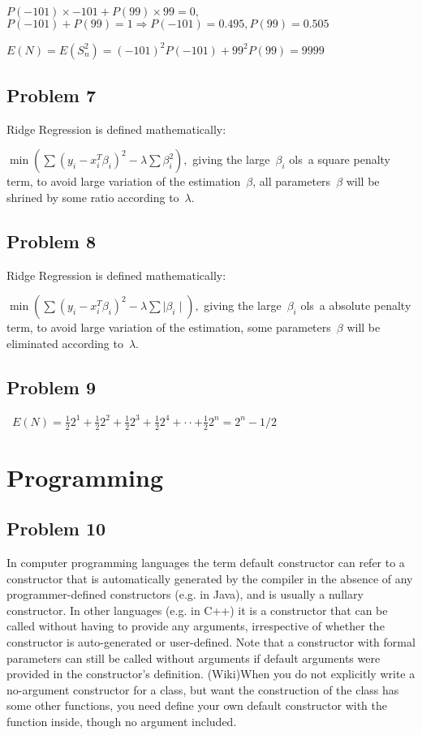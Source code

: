 \documentclass[10pt]{article}
\begin{document}
$P( -101) \times  -101 +P(99) \times 99 =0 ,$ $P( -101) +P(99) =1 \Longrightarrow P( -101) =0.495 ,P(99) =0.505$

$E(N) =E(S_{n}^{2}) =( -101)^{2}P( -101) +99^{2}P(99) =9999$

\subsection*{Problem 7~}
Ridge Regression is defined mathematically:

$\min (\sum (y_{i} -x_{i}^{T}\beta _{i})^{2} -\lambda \sum \beta _{i}^{2}) ,$ giving the large~$\beta _{i}$ ols~a square penalty term, to avoid large variation of the estimation~$\beta $, all parameters~$\beta $ will be shrined by some ratio according to~$\lambda $.

\subsection*{Problem 8~}
Ridge Regression is defined mathematically:

$\min (\sum (y_{i} -x_{i}^{T}\beta _{i})^{2} -\lambda \sum  \mid \beta _{i} \mid ) ,$ giving the large~$\beta _{i}$ ols~a absolute penalty term, to avoid large variation of the estimation, some parameters~$\beta $ will be eliminated according to~$\lambda $.

\subsection*{Problem 9}
~$E(N) =\frac{1}{2}2^{1} +\frac{1}{2}2^{2} +\frac{1}{2}2^{3} +\frac{1}{2}2^{4} + \cdot  \cdot $$ +\frac{1}{2}2^{n} =2^{n} -1/2$

\newpage

\section{Programming}

\subsection*{Problem 10~}
In computer programming languages the term default constructor can refer to a constructor that is automatically generated by the compiler in the absence of any programmer-defined constructors (e.g. in Java), and is usually a nullary constructor. In other languages (e.g. in C++) it is a constructor that can be called without having to provide any arguments, irrespective of whether the constructor is auto-generated or user-defined. Note that a constructor with formal parameters can still be called without arguments if default arguments were provided in the constructor's definition. (Wiki)When you do not explicitly write a no-argument constructor for a class, but want the construction of the class has some other functions, you need define your own default constructor with the function inside, though no argument included.
\end{document}
